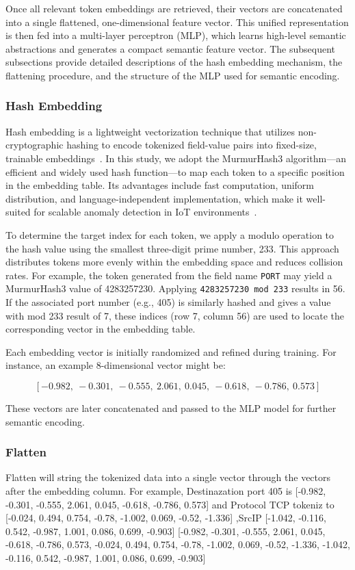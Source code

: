 \begin{ZhChapter}
Once all relevant token embeddings are retrieved, their vectors are concatenated into a single flattened, one-dimensional feature vector. This unified representation is then fed into a multi-layer perceptron (MLP), which learns high-level semantic abstractions and generates a compact semantic feature vector. The subsequent subsections provide detailed descriptions of the hash embedding mechanism, the flattening procedure, and the structure of the MLP used for semantic encoding.

\subsubsection{Hash Embedding}
Hash embedding is a lightweight vectorization technique that utilizes non-cryptographic hashing to encode tokenized field-value pairs into fixed-size, trainable embeddings~\cite{weinberger2009feature}. In this study, we adopt the MurmurHash3 algorithm—an efficient and widely used hash function—to map each token to a specific position in the embedding table. Its advantages include fast computation, uniform distribution, and language-independent implementation, which make it well-suited for scalable anomaly detection in IoT environments~\cite{appleby2011murmurhash}.

To determine the target index for each token, we apply a modulo operation to the hash value using the smallest three-digit prime number, 233. This approach distributes tokens more evenly within the embedding space and reduces collision rates. For example, the token generated from the field name \texttt{PORT} may yield a MurmurHash3 value of 4283257230. Applying \texttt{4283257230 mod 233} results in 56. If the associated port number (e.g., 405) is similarly hashed and gives a value with mod 233 result of 7, these indices (row 7, column 56) are used to locate the corresponding vector in the embedding table.

Each embedding vector is initially randomized and refined during training. For instance, an example 8-dimensional vector might be:



\[
[-0.982,\ -0.301,\ -0.555,\ 2.061,\ 0.045,\ -0.618,\ -0.786,\ 0.573]
\]



These vectors are later concatenated and passed to the MLP model for further semantic encoding.




\subsubsection{Flatten}
Flatten will string the tokenized data into a single vector through the vectors after the embedding column. For example, Destinazation port 405 is [-0.982, -0.301, -0.555, 2.061, 0.045, -0.618, -0.786, 0.573] and Protocol TCP tokeniz to [-0.024, 0.494, 0.754, -0.78, -1.002, 0.069, -0.52, -1.336] ,SrcIP [-1.042, -0.116, 0.542, -0.987, 1.001, 0.086, 0.699, -0.903]
[-0.982, -0.301, -0.555, 2.061, 0.045, -0.618, -0.786, 0.573, -0.024, 0.494, 0.754, -0.78, -1.002, 0.069, -0.52, -1.336, -1.042, -0.116, 0.542, -0.987, 1.001, 0.086, 0.699, -0.903]



\end{ZhChapter}
